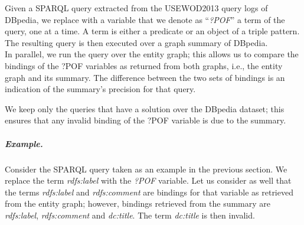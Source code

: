 Given a SPARQL query extracted from the USEWOD2013 query logs of DBpedia, we replace with a variable that we denote as ``\emph{?POF}'' a term of the query, one at a time. A term is either a predicate or an object of a triple pattern. The resulting query is then executed over a graph summary of DBpedia.\\

In parallel, we run the query over the entity graph; this allows us to compare the bindings of the ?POF variables as returned from both graphs, i.e., the entity graph and its summary. The difference between the two sets of bindings is an indication of the summary's precision for that query.

We keep only the queries that have a solution over the DBpedia dataset; this ensures that any invalid binding of the ?POF variable is due to the summary.

\subparagraph{Example.}

Consider the SPARQL query taken as an example in the previous section. We replace the term \emph{rdfs:label} with the \emph{?POF} variable. Let us consider as well that the terms \emph{rdfs:label} and \emph{rdfs:comment} are bindings for that variable as retrieved from the entity graph; however, bindings retrieved from the summary are \emph{rdfs:label}, \emph{rdfs:comment} and \emph{dc:title}. The term \emph{dc:title} is then invalid.

